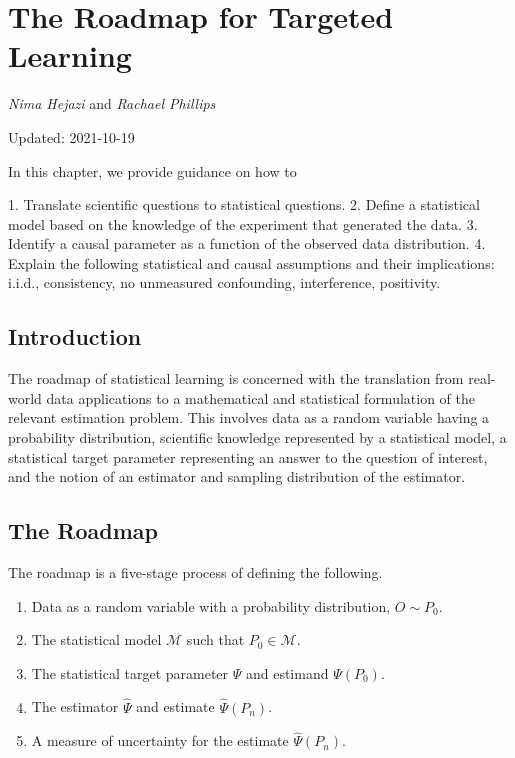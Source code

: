 \documentclass[
  12pt, krantz2,
]{krantz}
\providecommand{\tightlist}{%
  \setlength{\itemsep}{0pt}\setlength{\parskip}{0pt}}
\theoremstyle{definition}
\theoremstyle{definition}
\theoremstyle{definition}
\newcommand{\M}{\mathcal{M}}
\newcommand{\1}{\mathbbm{1}}
\begin{document}
\hypertarget{intro}{%
\chapter{The Roadmap for Targeted Learning}\label{intro}}

\emph{Nima Hejazi} and \emph{Rachael Phillips}

Updated: 2021-10-19

\begin{VT1}



In this chapter, we provide guidance on how to

1. Translate scientific questions to statistical questions.
2. Define a statistical model based on the knowledge of the experiment that
   generated the data.
3. Identify a causal parameter as a function of the observed data distribution.
4. Explain the following statistical and causal assumptions and their
   implications: i.i.d., consistency, no unmeasured confounding, interference,
   positivity.

\end{VT1}

\hypertarget{introduction}{%
\section*{Introduction}\label{introduction}}


The roadmap of statistical learning is concerned with the translation from
real-world data applications to a mathematical and statistical formulation of
the relevant estimation problem. This involves data as a random variable having
a probability distribution, scientific knowledge represented by a statistical
model, a statistical target parameter representing an answer to the question of
interest, and the notion of an estimator and sampling distribution of the
estimator.

\hypertarget{roadmap}{%
\section{The Roadmap}\label{roadmap}}

The roadmap is a five-stage process of defining the following.

\begin{enumerate}
\def\labelenumi{\arabic{enumi}.}
\tightlist
\item
  Data as a random variable with a probability distribution, \(O \sim P_0\).
\item
  The statistical model \(\M\) such that \(P_0 \in \M\).
\item
  The statistical target parameter \(\Psi\) and estimand \(\Psi(P_0)\).
\item
  The estimator \(\hat{\Psi}\) and estimate \(\hat{\Psi}(P_n)\).
\item
  A measure of uncertainty for the estimate \(\hat{\Psi}(P_n)\).
\end{enumerate}
\end{document}

